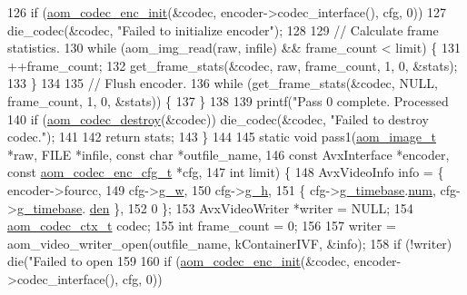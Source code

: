 \begin{DoxyCodeInclude}
{126   \textcolor{keywordflow}{if} (\hyperlink{group__encoder_gaade68a7d33d30f97dc9a596aa5e065d8}{aom\_codec\_enc\_init}(&codec, encoder->codec\_interface(), cfg, 0))
127     die\_codec(&codec, \textcolor{stringliteral}{"Failed to initialize encoder"});
128 
129   \textcolor{comment}{// Calculate frame statistics.}
130   \textcolor{keywordflow}{while} (aom\_img\_read(raw, infile) && frame\_count < limit) \{
131     ++frame\_count;
132     get\_frame\_stats(&codec, raw, frame\_count, 1, 0, &stats);
133   \}
134 
135   \textcolor{comment}{// Flush encoder.}
136   \textcolor{keywordflow}{while} (get\_frame\_stats(&codec, NULL, frame\_count, 1, 0, &stats)) \{
137   \}
138 
139   printf(\textcolor{stringliteral}{"Pass 0 complete. Processed %
140   \textcolor{keywordflow}{if} (\hyperlink{group__codec_ga9b60e186f61ba2d6ab2b8069b76a15c5}{aom\_codec\_destroy}(&codec)) die\_codec(&codec, \textcolor{stringliteral}{"Failed to destroy codec."});
141 
142   \textcolor{keywordflow}{return} stats;
143 \}
144 
145 \textcolor{keyword}{static} \textcolor{keywordtype}{void} pass1(\hyperlink{structaom__image}{aom\_image\_t} *raw, FILE *infile, \textcolor{keyword}{const} \textcolor{keywordtype}{char} *outfile\_name,
146                   \textcolor{keyword}{const} AvxInterface *encoder, \textcolor{keyword}{const} \hyperlink{structaom__codec__enc__cfg}{aom\_codec\_enc\_cfg\_t} *cfg,
147                   \textcolor{keywordtype}{int} limit) \{
148   AvxVideoInfo info = \{ encoder->fourcc,
149                         cfg->\hyperlink{structaom__codec__enc__cfg_a80cb459c5ef3c7e1516f617c4c9d6eab}{g\_w},
150                         cfg->\hyperlink{structaom__codec__enc__cfg_a37b0f57b63bec8d133df8901d4407ee6}{g\_h},
151                         \{ cfg->\hyperlink{structaom__codec__enc__cfg_a10664f1fc5b6ec29b77ee13efeeecdf7}{g\_timebase}.\hyperlink{structaom__rational_a7b48174411798c780a15f132c4650839}{num}, cfg->\hyperlink{structaom__codec__enc__cfg_a10664f1fc5b6ec29b77ee13efeeecdf7}{g\_timebase}.
      \hyperlink{structaom__rational_adeddf2ea01c12b7be66536e0a0fb92c5}{den} \},
152                         0 \};
153   AvxVideoWriter *writer = NULL;
154   \hyperlink{structaom__codec__ctx}{aom\_codec\_ctx\_t} codec;
155   \textcolor{keywordtype}{int} frame\_count = 0;
156 
157   writer = aom\_video\_writer\_open(outfile\_name, kContainerIVF, &info);
158   \textcolor{keywordflow}{if} (!writer) die(\textcolor{stringliteral}{"Failed to open %
159 
160   \textcolor{keywordflow}{if} (\hyperlink{group__encoder_gaade68a7d33d30f97dc9a596aa5e065d8}{aom\_codec\_enc\_init}(&codec, encoder->codec\_interface(), cfg, 0))
}}}
\end{DoxyCodeInclude}
